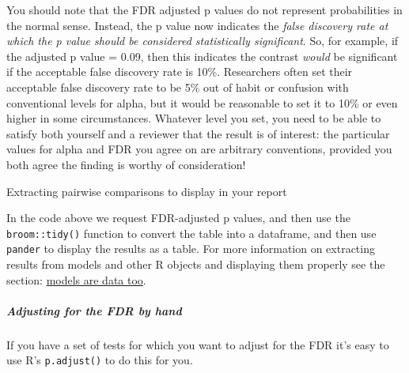 \documentclass[]{article}
\newenvironment{Shaded}{\begin{snugshade}}{\end{snugshade}}
\newcommand{\KeywordTok}[1]{\textcolor[rgb]{0.13,0.29,0.53}{\textbf{#1}}}
\newcommand{\DataTypeTok}[1]{\textcolor[rgb]{0.13,0.29,0.53}{#1}}
\newcommand{\DecValTok}[1]{\textcolor[rgb]{0.00,0.00,0.81}{#1}}
\newcommand{\StringTok}[1]{\textcolor[rgb]{0.31,0.60,0.02}{#1}}
\newcommand{\OperatorTok}[1]{\textcolor[rgb]{0.81,0.36,0.00}{\textbf{#1}}}
\newcommand{\NormalTok}[1]{#1}
\let\oldsubparagraph\subparagraph
\renewcommand{\subparagraph}[1]{\oldsubparagraph{#1}\mbox{}}
\theoremstyle{definition}
\theoremstyle{definition}
\theoremstyle{definition}
\theoremstyle{remark}
\begin{document}
You should note that the FDR adjusted p values do not represent
probabilities in the normal sense. Instead, the p value now indicates
the \emph{false discovery rate at which the p value should be considered
statistically significant}. So, for example, if the adjusted p value =
0.09, then this indicates the contrast \emph{would} be significant if
the acceptable false discovery rate is 10\%. Researchers often set their
acceptable false discovery rate to be 5\% out of habit or confusion with
conventional levels for alpha, but it would be reasonable to set it to
10\% or even higher in some circumstances. Whatever level you set, you
need to be able to satisfy both yourself and a reviewer that the result
is of interest: the particular values for alpha and FDR you agree on are
arbitrary conventions, provided you both agree the finding is worthy of
consideration!

Extracting pairwise comparisons to display in your report

In the code above we request FDR-adjusted p values, and then use the
\texttt{broom::tidy()} function to convert the table into a dataframe,
and then use \texttt{pander} to display the results as a table. For more
information on extracting results from models and other R objects and
displaying them properly see the section:
\protect\hyperlink{models-are-data-too}{models are data too}.

\subparagraph{Adjusting for the FDR by
hand}\label{adjusting-for-the-fdr-by-hand}

If you have a set of tests for which you want to adjust for the FDR it's
easy to use R's \texttt{p.adjust()} to do this for you.

\begin{Shaded}
\end{Shaded}
\end{document}
